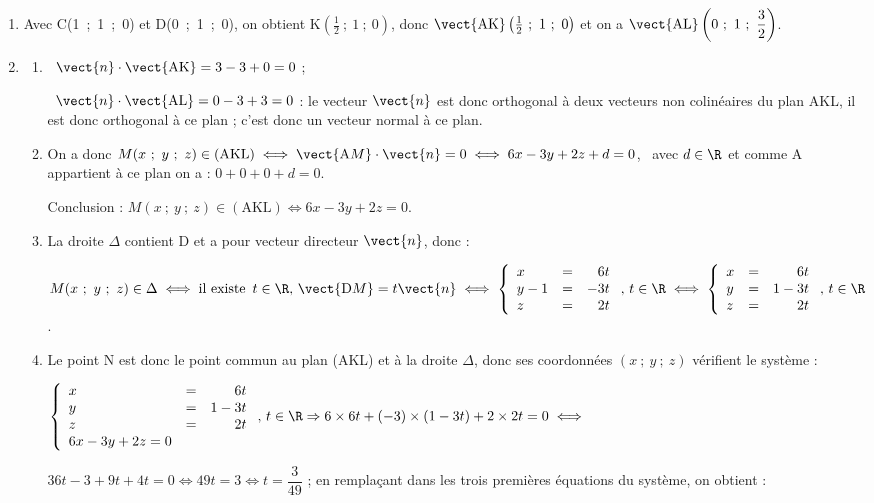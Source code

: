 \begin{enumerate}
\item 
Avec C(1~;~1~;~0) et D(0~;~1~;~0), on obtient K$\left(\frac{1}{2}~;~1~;~0\right)$, donc $\vect{\text{AK}}\left(\frac{1}{2}~;~1~;~0\right)$ et on a $\vect{\text{AL}}\left(0~;~1~;~\dfrac{3}{2}\right)$.
\item  
	\begin{enumerate}
		\item 
\starredbullet~$\vect{n} \cdot \vect{\text{AK}} = 3 - 3 + 0 = 0$ ;

\starredbullet~$\vect{n} \cdot \vect{\text{AL}} = 0 - 3 + 3 = 0$ : le vecteur $\vect{n}$ est donc orthogonal à deux vecteurs non colinéaires du plan AKL, il est donc orthogonal à ce plan ; c'est donc un vecteur normal à ce plan.
		\item 
On a donc $M(x~;~y~;~z) \in (\text{AKL}) \iff \vect{\text{A}M} \cdot \vect{n} = 0 \iff 6x - 3y + 2z + d = 0$, \, avec $d \in \R$  et comme A appartient à ce plan on a : $ 0 + 0 + 0 + d = 0$.

Conclusion : $M(x~;~y~;~z) \in (\text{AKL}) \iff 6x - 3y + 2z = 0$.
		\item 
La droite $\Delta$ contient D et a pour vecteur directeur $\vect{n}$, donc :

$M(x~;~y~;~z) \in \Delta \iff \text{il existe }\, t \in \R, \, \vect{\text{D}M} = t\vect{n} \iff \left\{\begin{array}{l c r}
x		&=&6t\\
y - 1	&=&-3t\\
z		&=&2t
\end{array}\right.,\, t \in \R \iff \left\{\begin{array}{l c r}
x		&=&6t\\
y		&=&1-3t\\
z		&=&2t
\end{array}\right.,\, t \in \R$.
		\item 
		Le point N est donc le point commun au plan (AKL) et à la droite $\Delta$, donc ses coordonnées $(x~;~y~;~z)$ vérifient le système :
		
		$\left\{\begin{array}{l c r}
x		&=&6t\\
y		&=&1-3t\\
z		&=&2t\\
6x - 3y + 2z = 0
\end{array}\right.,\, t \in \R \Rightarrow 6 \times 6t + (-3)\times (1 - 3t) + 2\times 2t = 0 \iff$

$36t - 3 + 9t + 4t = 0 \iff 49t = 3 \iff t = \dfrac{3}{49}$ ; en remplaçant dans les trois premières équations du système, on obtient :


\end{enumerate}
\end{enumerate}
